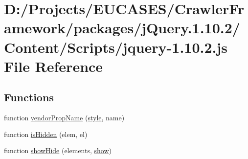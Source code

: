 \hypertarget{jquery-1_810_82_8js}{\section{D\-:/\-Projects/\-E\-U\-C\-A\-S\-E\-S/\-Crawler\-Framework/packages/j\-Query.1.10.2/\-Content/\-Scripts/jquery-\/1.10.2.js File Reference}
\label{jquery-1_810_82_8js}
}
\subsection*{Functions}
\begin{DoxyCompactItemize}
\item 
function \hyperlink{jquery-1_810_82_8js_a6a111234d6e26ce833f8fabd50819b7a}{vendor\-Prop\-Name} (\hyperlink{jquery-1_810_82-vsdoc_8js_af3f76f18e38dd06c0a345ede43abb420}{style}, name)
\item 
function \hyperlink{jquery-1_810_82_8js_a67ed58d688ff11991ca2826ebfbf28a4}{is\-Hidden} (elem, el)
\item 
function \hyperlink{jquery-1_810_82_8js_a002b8e481f3ab2a83194366aceb7a706}{show\-Hide} (elements, \hyperlink{jquery-1_810_82-vsdoc_8js_a8dcdb81268297f0ecf76be5e6aebd05c}{show})
\item 

\end{DoxyCompactItemize}
